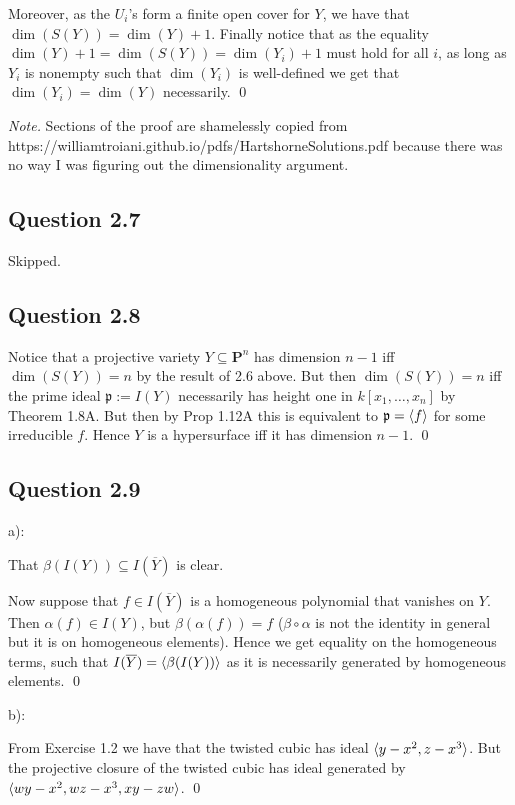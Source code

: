 \documentclass{article}
\begin{document}
Moreover, as the $U_i$'s form a finite open cover for $Y$, we have that $\dim(S(Y)) = \dim(Y)+1$. Finally notice that as the equality $\dim(Y)+1 = \dim(S(Y)) = \dim(Y_i) + 1$ must hold for all $i$, as long as $Y_i$ is nonempty such that $\dim(Y_i)$ is well-defined we get that $\dim(Y_i) = \dim(Y)$ necessarily. \qed
\lspace
\lspace

\textit{Note.} Sections of the proof are shamelessly copied from https://williamtroiani.github.io/pdfs/HartshorneSolutions.pdf because there was no way I was figuring out the dimensionality argument.
\lspace

\subsection*{Question 2.7}

Skipped.

\subsection*{Question 2.8}

Notice that a projective variety $Y \subseteq \mathbf{P}^n$ has dimension $n-1$ iff $\dim(S(Y)) = n$ by the result of 2.6 above. But then $\dim(S(Y)) = n$ iff the prime ideal $\mathfrak p:= I(Y)$ necessarily has height one in $k[x_1,\dots,x_n]$ by Theorem 1.8A. But then by Prop 1.12A this is equivalent to $\mathfrak p = \langle f\rangle$ for some irreducible $f$. Hence $Y$ is a hypersurface iff it has dimension $n-1$. \qed
\lspace

\subsection*{Question 2.9}

\noindent a):

That $\beta(I(Y)) \subseteq I(\overline Y)$ is clear.

Now suppose that $f \in I(\overline Y)$ is a homogeneous polynomial that vanishes on $Y$. Then $\alpha(f) \in I(Y)$, but $\beta(\alpha(f)) = f$ ($\beta \circ \alpha$ is not the identity in general but it is on homogeneous elements). Hence we get equality on the homogeneous terms, such that $I(\overline Y) = \langle\beta(I(Y))\rangle$ as it is necessarily generated by homogeneous elements. \qed

\noindent b):

From Exercise 1.2 we have that the twisted cubic has ideal $\langle y-x^2,z-x^3\rangle$. But the projective closure of the twisted cubic has ideal generated by $\langle wy-x^2,wz-x^3,xy-zw\rangle$. \qed
\lspace
\lspace
\end{document}
